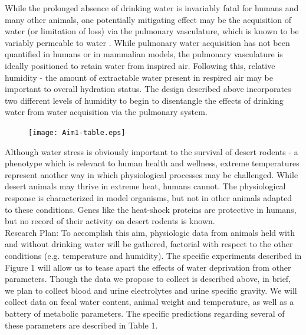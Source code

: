 \documentclass[12pt]{article}
\begin{document}
While the prolonged absence of drinking water is invariably fatal for humans and many other animals, one potentially mitigating effect may be the acquisition of water (or limitation of loss) via the pulmonary vasculature, which is known to be variably permeable to water \citep{Berger:2011ks,Goralski:2010eo}. While pulmonary water acquisition has not been quantified in humans or in mammalian models, the pulmonary vasculature is ideally positioned to retain water from inspired air. Following this, relative humidity -  the amount of extractable water present in respired air may be important to overall hydration status. The design described above incorporates two different levels of humidity to begin to disentangle the effects of drinking water from water acquisition via the pulmonary system. \\

\begin{figure}
\hypertarget{Table 1}{}
\vspace{-5mm}
\begin{mdframed}
  \begin{center}
    \texttt{[image: Aim1-table.eps]}
  \end{center}
\end{mdframed}
\end{figure}

Although water stress is obviously important to the survival of desert rodents - a phenotype which is relevant to human health and wellness, extreme temperatures represent another way in which physiological processes may be challenged. While desert animals may thrive in extreme heat, humans cannot. The physiological response is characterized in model organisms, but not in other animals adapted to these conditions. Genes like the heat-shock proteins are protective in humans, but no record of their activity on desert rodents is known. \\

Research Plan: To accomplish this aim, physiologic data from animals held with and without drinking water will be gathered, factorial with respect to the other conditions (e.g. temperature and humidity). The specific experiments described in \hypertarget{Figure 1}{Figure 1} will allow us to tease apart the effects of water deprivation from other parameters. Though the data we propose to collect is described above, in brief, we plan to collect blood and urine electrolytes and urine specific gravity. We will collect data on fecal water content, animal weight and temperature, as well as a battery of metabolic parameters. The specific predictions regarding several of these parameters are described in Table 1.  \\
\end{document}
